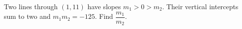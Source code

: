 Two lines through $(1,11)$ have slopes $m_1>0>m_2$. Their vertical intercepts sum to two and $m_1m_2=-125$. Find $\dfrac{m_1}{m_2}$.
